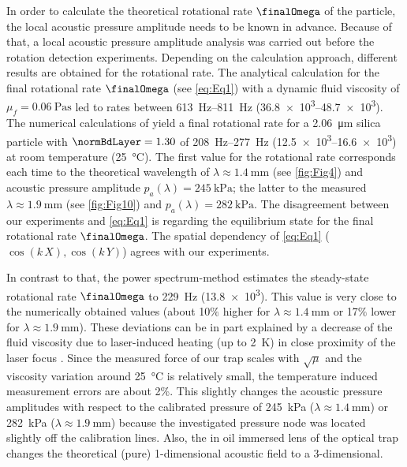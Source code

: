 In order to calculate the theoretical rotational rate $\finalOmega$ of the 
particle, the local acoustic pressure amplitude needs to be known in advance.  
Because of that, a local acoustic pressure amplitude analysis was carried out 
before the rotation detection experiments. Depending on the calculation 
approach, different results are obtained for the rotational rate. The analytical 
calculation for the final rotational rate $\finalOmega$ (see \cref{eq:Eq1}) 
\cite{lamprecht2015, Busse, Rudnick, Wang} with a dynamic fluid viscosity of 
$\mu_{f} = \SI{0.06}{\pascal\second}$ led to rates between 
\SIrange{613}{811}{\hertz} (\SIrange{36.8e3}{48.7e3}{\rpm}). The numerical 
calculations of \citeauthor{hahn2016} \cite{hahn2016} yield a final rotational 
rate for a \SI{2.06}{\micro\meter} silica particle with $\normBdLayer=1.30$ of 
\SIrange{208}{277}{\hertz} (\SIrange{12.5e3}{16.6e3}{\rpm}) at room temperature 
(\SI{25}{\celsius}).  The first value for the rotational rate corresponds each 
time to the theoretical wavelength of $\lambda \approx \SI{1.4}{\mm}$ (see 
\cref{fig:Fig4}) and acoustic pressure amplitude $p_{a}\left(\lambda\right) = 
\SI{245}{\kilo\pascal} $; the latter to the measured $\lambda \approx 
\SI{1.9}{\mm}$ (see \cref{fig:Fig10}) and $p_{a}\left(\lambda\right) = 
\SI{282}{\kilo\pascal} $. The disagreement between our experiments and 
\cref{eq:Eq1} is regarding the equilibrium state for the final rotational rate 
$\finalOmega$. The spatial dependency of \cref{eq:Eq1} ($\cos\left(k\,X\right), 
\cos\left( k\,Y \right)$) agrees with our experiments.

In contrast to that, the power spectrum-method estimates the steady-state 
rotational rate $\finalOmega$ to \SI{229}{\hertz} (\SI{13.8e3}{\rpm}). This 
value is very close to the numerically obtained values (about 10$\%$ higher for 
$\lambda \approx \SI{1.4}{\mm}$ or 17$\%$ lower for $\lambda \approx 
\SI{1.9}{\mm}$).  These deviations can be in part explained by a decrease of 
the fluid viscosity due to laser-induced heating (up to \SI{2}{\kelvin}) in 
close proximity of the laser focus \cite{peterman2003}. Since the measured force 
of our trap scales with $\sqrt{\mu}$ and the viscosity variation around 
\SI{25}{\celsius} is relatively small, the temperature induced measurement 
errors are about 2\%.  This slightly changes the acoustic pressure amplitudes 
with respect to the calibrated pressure of \SI{245}{\kilo\pascal} ($\lambda 
\approx \SI{1.4}{\mm}$) or \SI{282}{\kilo\pascal} ($\lambda \approx 
\SI{1.9}{\mm}$) because the investigated pressure node was located slightly off 
the calibration lines.  Also, the in oil immersed lens of the optical trap 
changes the theoretical (pure) 1-dimensional acoustic field to a 3-dimensional.

